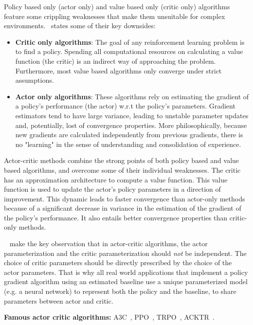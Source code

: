 \documentclass{../main.tex}{}
\begin{document}
Policy based only (actor only) and value based only (critic only) algorithms feature some crippling weaknesses that make them unsuitable for complex environments.~\citep{Konda2000} states some of their key downsides:
\begin{itemize}
\item \textbf{Critic only algorithms}: The goal of any reinforcement learning problem is to find a policy. Spending all computational resources on calculating a value function (the critic) is an indirect way of approaching the problem. Furthermore, most value based algorithms only converge under strict assumptions.
\item \textbf{Actor only algorithms}: These algorithms rely on estimating the gradient of a policy's performance (the actor) w.r.t the policy's parameters. Gradient estimators tend to have large variance, leading to unstable parameter updates and, potentially, lost of convergence properties. More philosophically, because new gradients are calculated independently from previous gradients, there is no "learning" in the sense of understanding and consolidation of experience.
\end{itemize}

Actor-critic methods combine the strong points of both policy based and value based algorithms, and overcome some of their individual weaknesses. The critic has an approximation architecture to compute a value function. This value function is used to update the actor's policy parameters in a direction of improvement. This dynamic leads to faster convergence than actor-only methods because of a significant decrease in variance in the estimation of the gradient of the policy's performance. It also entails better convergence properties than critic-only methods. 

~\cite{Konda2000} make the key observation that in actor-critic algorithms, the actor parameterization and the critic parameterization should \textit{not} be independent. The choice of critic parameters should be directly prescribed by the choice of the actor parameters. That is why all real world applications that implement a policy gradient algorithm using an estimated baseline use a unique parameterized model (e.g. a neural network) to represent both the policy and the baseline, to share parameters between actor and critic.

\textbf{Famous actor critic algorithms:} A3C~\citep{Mnih2016}, PPO~\citep{Schulman2017}, TRPO~\citep{Schulman2015}, ACKTR~\citep{Wu2017}.
\end{document}
